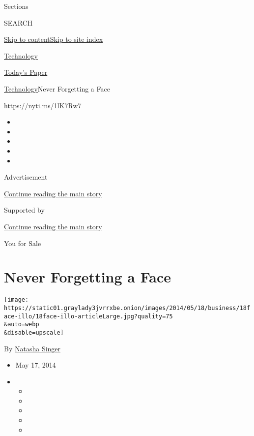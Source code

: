Sections

SEARCH

\protect\hyperlink{site-content}{Skip to
content}\protect\hyperlink{site-index}{Skip to site index}

\href{https://www.nytimes3xbfgragh.onion/section/technology}{Technology}

\href{https://myaccount.nytimes3xbfgragh.onion/auth/login?response_type=cookie\&client_id=vi}{}

\href{https://www.nytimes3xbfgragh.onion/section/todayspaper}{Today's
Paper}

\href{/section/technology}{Technology}\textbar{}Never Forgetting a Face

\href{https://nyti.ms/1lK7Rw7}{https://nyti.ms/1lK7Rw7}

\begin{itemize}
\item
\item
\item
\item
\item
\end{itemize}

Advertisement

\protect\hyperlink{after-top}{Continue reading the main story}

Supported by

\protect\hyperlink{after-sponsor}{Continue reading the main story}

You for Sale

\hypertarget{never-forgetting-a-face}{%
\section{Never Forgetting a Face}\label{never-forgetting-a-face}}

\texttt{[image: https://static01.graylady3jvrrxbe.onion/images/2014/05/18/business/18face-illo/18face-illo-articleLarge.jpg?quality=75\\\&auto=webp\\\&disable=upscale]}

By \href{http://www.nytimes3xbfgragh.onion/by/natasha-singer}{Natasha
Singer}

\begin{itemize}
\item
  May 17, 2014
\item
  \begin{itemize}
  \item
  \item
  \item
  \item
  \item
  \end{itemize}
\end{itemize}


